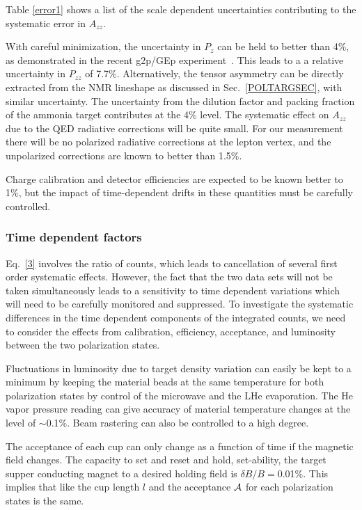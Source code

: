 Table \ref{error1} shows a list of the scale dependent uncertainties contributing to the systematic error in $A_{zz}$.

With careful minimization, the uncertainty in $P_z$ can be held to better than
4\%, as demonstrated in the recent g2p/GEp experiment~\cite{DUSTIN}. 
This leads to a a relative uncertainty in $P_{zz}$ of 7.7\%.  Alternatively, the tensor asymmetry can be directly extracted from the NMR lineshape as discussed in Sec.~\ref{POLTARGSEC}, with similar uncertainty.  The uncertainty from the dilution factor and packing fraction of the ammonia target contributes at the 4\% level.
%
The systematic effect on $A_{zz}$ due to the QED radiative corrections will be quite small.  For our measurement
there will be no polarized radiative corrections at the lepton vertex, and the unpolarized corrections are known
to better than 1.5\%.


Charge calibration and detector efficiencies are expected to be known better to 1\%, but the impact of time-dependent drifts in these quantities must be carefully controlled.

\subsubsection*{Time dependent factors}
Eq.~\ref{3} involves the ratio of counts, which leads to cancellation of several first order systematic effects.  However, the fact that the two data sets will not be taken simultaneously leads to a sensitivity to time dependent variations which will need to be carefully monitored and suppressed.
%
To investigate the systematic differences in the time dependent components of the
integrated counts, we need to consider the effects from calibration, efficiency, acceptance,
and luminosity between the two polarization states.

Fluctuations in luminosity due to target density variation can easily be kept to a
minimum by keeping the material beads at the same temperature for both polarization
states by control of the microwave and the LHe evaporation.  The He vapor pressure reading
can give accuracy of material temperature changes at the level of $\sim$0.1\%.
Beam rastering can also be controlled to a high degree. 

The acceptance of each cup can only change as a function of time if the magnetic field
changes.  The capacity to set and reset and hold, set-ability, the target supper conducting magnet
to a desired holding field is $\delta B /B=$0.01\%.  This implies that like the cup length $l$ and the
acceptance ${\cal A}$ for each polarization states is the same.

